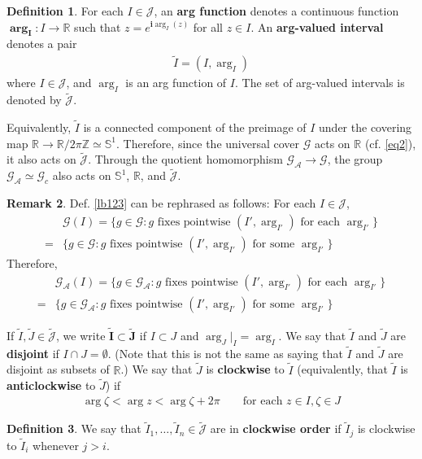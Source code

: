 \documentclass[11pt,b5paper,notitlepage]{article}
\theoremstyle{definition}
\newtheorem{df}{Definition}[section]
\newtheorem{rem}[df]{Remark}
\theoremstyle{plain}
\newcommand{\wtd}{\widetilde}
\newcommand{\GA}{\mathscr G_{\mathcal A}}
\newcommand{\Jtd}{\widetilde{\mathcal J}}
\newcommand{\im}{\mathbf{i}}
\newcommand{\Zbb}{\mathbb Z}
\newcommand{\Rbb}{\mathbb R}
\newcommand{\Sbb}{{\mathbb S}}
\newcommand{\Gc}{\mathscr G_c}
\newcommand{\MJ}{\mathcal J}
\newcommand{\SG}{\mathscr G}
\numberwithin{equation}{section}
\begin{document}
\begin{df}\label{lb160}
For each $I\in\MJ$, an \textbf{arg function} denotes a continuous function $\pmb{\arg_I}:I\rightarrow\Rbb$ such that $z=e^{\im\arg_I(z)}$ for all $z\in I$. An \textbf{arg-valued interval} denotes a pair
\begin{align*}
\wtd I=(I,\arg_I)
\end{align*} 
where $I\in\MJ$, and $\arg_I$ is an arg function of $I$. The set of arg-valued intervals is denoted by $\pmb{\Jtd}$.
\end{df}


Equivalently, $\wtd I$ is a connected component of the preimage of $I$ under the covering map $\Rbb\rightarrow \Rbb/2\pi\Zbb\simeq\Sbb^1$. Therefore, since the universal cover $\SG$ acts on $\Rbb$ (cf. \eqref{eq2}), it also acts on $\Jtd$. Through the quotient homomorphism $\GA\rightarrow\SG$, the group $\GA\simeq\Gc$ also acts on $\Sbb^1$, $\Rbb$, and $\Jtd$.

\begin{rem}\label{lb129}
Def. \ref{lb123} can be rephrased as follows: For each $I\in\MJ$, 
\begin{align*}
&\SG(I)=\{g\in\SG:g \text{ fixes pointwise } (I',\arg_{I'})\text{ for each }\arg_{I'}\}\\
=&\{g\in\SG:g \text{ fixes pointwise } (I',\arg_{I'})\text{ for some }\arg_{I'}\}
\end{align*}
Therefore,
\begin{align*}
&\GA(I)=\{g\in\GA:g \text{ fixes pointwise } (I',\arg_{I'})\text{ for each }\arg_{I'}\}\\
=&\{g\in\GA:g \text{ fixes pointwise } (I',\arg_{I'})\text{ for some }\arg_{I'}\}
\end{align*}
\end{rem}



If $\wtd I,\wtd J\in\Jtd$, we write $\pmb{\wtd I\subset\wtd J}$ if $I\subset J$ and $\arg_J|_I=\arg_I$. We say that $\wtd I$ and $\wtd J$ are \textbf{disjoint} if $I\cap J=\emptyset$. (Note that this is not the same as saying that $\wtd I$ and $\wtd J$ are disjoint as subsets of $\Rbb$.) We say that $\wtd J$ is \textbf{clockwise} to $\wtd I$ (equivalently, that $\wtd I$ is \textbf{anticlockwise} to $\wtd J$) if
\begin{align*}
\arg \zeta<\arg z<\arg\zeta+2\pi\qquad\text{for each }z\in I,\zeta\in J
\end{align*}

\begin{df}
We say that $\wtd I_1,\dots,\wtd I_n\in\Jtd$ are in \textbf{clockwise order} if $\wtd I_j$ is clockwise to $\wtd I_i$ whenever $j>i$.
\end{df}
\end{document}
